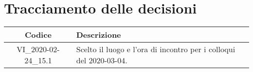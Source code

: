 \section*{Tracciamento delle decisioni}

\begin{center}
	\begin{longtable}{|c|p{12.25cm}|}
	\hline
	\rowcolor{lighter-grayer}
	\textbf{Codice} & \textbf{Descrizione} \\
	\hline
	\endfirsthead
	
	\hline
		VI\_2020-02-24\_15.1 & Scelto il luogo e l'ora di incontro per i colloqui del 2020-03-04. \\
	\hline

	\end{longtable}
\end{center}